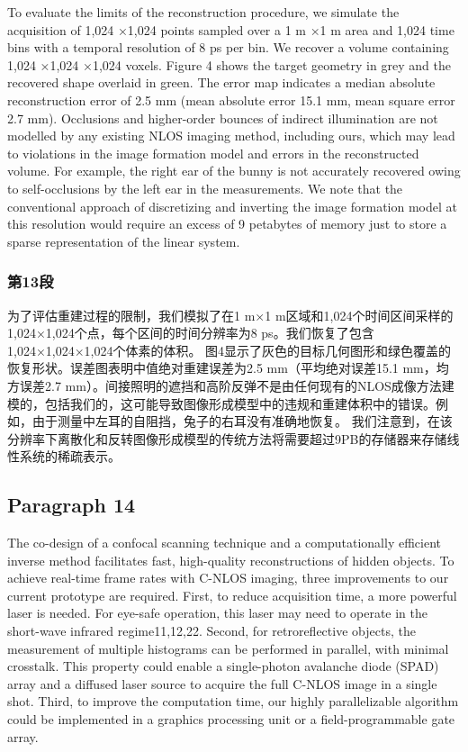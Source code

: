 \documentclass[11pt]{article}
\begin{document}
To evaluate the limits of the reconstruction procedure, we simulate the
acquisition of 1,024 ×1,024 points sampled over a 1 m ×1 m area and
1,024 time bins with a temporal resolution of 8 ps per bin. We recover a
volume containing 1,024 ×1,024 ×1,024 voxels. Figure 4 shows the target
geometry in grey and the recovered shape overlaid in green. The error
map indicates a median absolute reconstruction error of 2.5 mm (mean
absolute error 15.1 mm, mean square error 2.7 mm). Occlusions and
higher-order bounces of indirect illumination are not modelled by any
existing NLOS imaging method, including ours, which may lead to
violations in the image formation model and errors in the reconstructed
volume. For example, the right ear of the bunny is not accurately
recovered owing to self-occlusions by the left ear in the measurements.
We note that the conventional approach of discretizing and inverting the
image formation model at this resolution would require an excess of 9
petabytes of memory just to store a sparse representation of the linear
system.

    \subsubsection{第13段}\label{ux7b2c13ux6bb5}

为了评估重建过程的限制，我们模拟了在1 m×1
m区域和1,024个时间区间采样的1,024×1,024个点，每个区间的时间分辨率为8
ps。我们恢复了包含1,024×1,024×1,024个体素的体积。
图4显示了灰色的目标几何图形和绿色覆盖的恢复形状。误差图表明中值绝对重建误差为2.5
mm（平均绝对误差15.1 mm，均方误差2.7
mm）。间接照明的遮挡和高阶反弹不是由任何现有的NLOS成像方法建模的，包括我们的，这可能导致图像形成模型中的违规和重建体积中的错误。例如，由于测量中左耳的自阻挡，兔子的右耳没有准确地恢复。
我们注意到，在该分辨率下离散化和反转图像形成模型的传统方法将需要超过9PB的存储器来存储线性系统的稀疏表示。

    \subsection{Paragraph 14}\label{paragraph-14}

The co-design of a confocal scanning technique and a computationally
efficient inverse method facilitates fast, high-quality reconstructions
of hidden objects. To achieve real-time frame rates with C-NLOS imaging,
three improvements to our current prototype are required. First, to
reduce acquisition time, a more powerful laser is needed. For eye-safe
operation, this laser may need to operate in the short-wave infrared
regime11,12,22. Second, for retroreflective objects, the measurement of
multiple histograms can be performed in parallel, with minimal
crosstalk. This property could enable a single-photon avalanche diode
(SPAD) array and a diffused laser source to acquire the full C-NLOS
image in a single shot. Third, to improve the computation time, our
highly parallelizable algorithm could be implemented in a graphics
processing unit or a field-programmable gate array.
\end{document}
